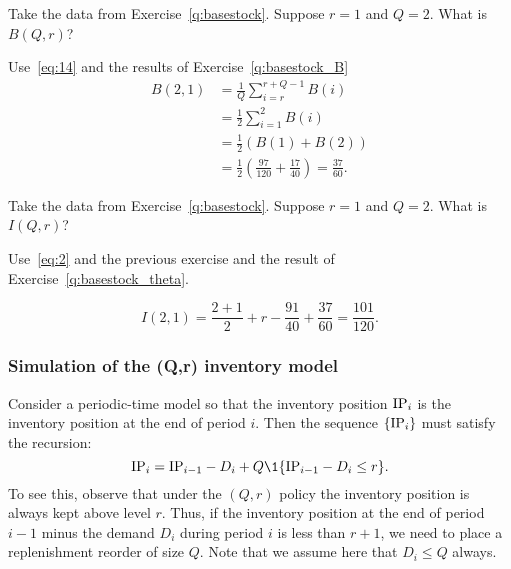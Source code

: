 \begin{question}
  Take the data from Exercise~\ref{q:basestock}. Suppose $r=1$ and $Q=2$. What is $B(Q,r)$?
\end{question}
\begin{solution}
Use~\eqref{eq:14} and the results of Exercise~\ref{q:basestock_B}
  \begin{equation*}
    \begin{split}
      B(2,1)
&= \frac1Q \sum_{i=r}^{r+Q-1} B(i) \\
&= \frac12 \sum_{i=1}^{2} B(i) \\
&= \frac12 (B(1) + B(2)) \\
&= \frac12 \left(\frac{97}{120} + \frac{17}{40}\right) = \frac{37}{60}.
\end{split}
\end{equation*}
\end{solution}


\begin{question}
  Take the data from Exercise~\ref{q:basestock}. Suppose $r=1$ and $Q=2$. What is $I(Q,r)$?
\end{question}
\begin{solution}
  Use~\eqref{eq:2} and the previous exercise and the result of Exercise~\ref{q:basestock_theta}.

  \begin{equation*}
    I(2,1)  = \frac{2+1}2 + r - \frac{91}{40}+ \frac{37}{60} = \frac{101}{120}.
  \end{equation*}
\end{solution}


\subsubsection{Simulation of the (Q,r) inventory model}

Consider a periodic-time model so that the inventory position $\textrm{IP}_i$
is the inventory position at the end of period $i$. Then the sequence
$\{\textrm{IP}_i\}$ must satisfy the recursion:
\begin{equation}
  \IP_i = \IP_{i-1} - D_i + Q \1{\IP_{i-1} - D_i\leq r}.
\end{equation}
To see this, observe that under the $(Q,r)$ policy the inventory
position is always kept above level $r$. Thus, if the inventory
position at the end of period $i-1$ minus the demand $D_i$ during
period $i$ is less than $r+1$, we need to place a replenishment
reorder of size $Q$.  Note that we assume here that $D_i\leq Q$ always.

